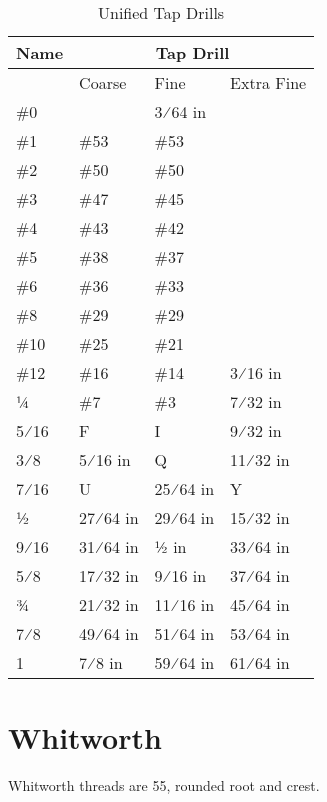\begin{table}[h!]
    \footnotesize
\begin{longtable}{l|lll}
	Name
    &\multicolumn{3}{c}{Tap Drill}
    \\
\hline
    &Coarse
    &Fine
    &Extra Fine
    \\
\hline

\#0 &&3⁄64 in &\\
\#1 &\#53 &\#53 &\\
\#2 &\#50 &\#50 &\\
\#3 &\#47 &\#45 &\\
\#4 &\#43 &\#42 &\\
\#5 &\#38 &\#37 &\\
\#6 &\#36 &\#33 &\\
\#8 &\#29 &\#29 &\\
\#10 &\#25 &\#21 &\\
\#12 &\#16 &\#14 &3⁄16 in\\
1⁄4 &\#7 &\#3 &7⁄32 in\\
5⁄16 &F &I &9⁄32 in\\
3⁄8 &5⁄16 in &Q &11⁄32 in\\
7⁄16 &U &25⁄64 in &Y\\
1⁄2 &27⁄64 in &29⁄64 in &15⁄32 in\\
9⁄16 &31⁄64 in &1⁄2 in &33⁄64 in\\
5⁄8 &17⁄32 in &9⁄16 in &37⁄64 in\\
3⁄4 &21⁄32 in &11⁄16 in &45⁄64 in\\
7⁄8 &49⁄64 in &51⁄64 in &53⁄64 in\\
1 &7⁄8 in &59⁄64 in &61⁄64 in\\
\end{longtable}
\caption{Unified Tap Drills}
\end{table}




\clearpage
\section{Whitworth}
Whitworth threads are 55\degree, rounded root and crest.
\\ \\ \\ \\ \\ \\ \\ \\ \\ \\ \\ \\ \\ \\ \\ \\ \\ \\               

